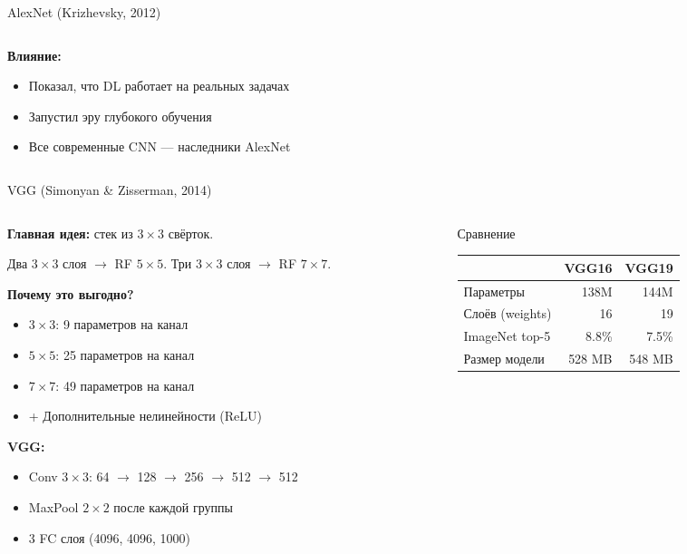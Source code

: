 \documentclass[aspectratio=169, 9pt]{beamer}
\begin{document}
\begin{frame}{AlexNet (Krizhevsky, 2012)}
\begin{columns}[T]
\begin{column}{0.5\textwidth}
      \vspace{0.3em}
      \textbf{Влияние:}
      \begin{itemize}
        \item Показал, что DL работает на реальных задачах
        \item Запустил эру глубокого обучения
        \item Все современные CNN — наследники AlexNet
      \end{itemize}
    \end{column}
  \end{columns}
\end{frame}

\begin{frame}{VGG (Simonyan \& Zisserman, 2014)}
  \begin{columns}[T]
    \begin{column}{0.5\textwidth}
      \textbf{Главная идея:} стек из $3\times3$ свёрток.
      
      \vspace{0.3em}
      Два $3\times3$ слоя $\to$ RF $5\times5$.
      Три $3\times3$ слоя $\to$ RF $7\times7$.
      
      \textbf{Почему это выгодно?}
      \begin{itemize}
        \item $3\times3$: 9 параметров на канал
        \item $5\times5$: 25 параметров на канал
        \item $7\times7$: 49 параметров на канал
        \item + Дополнительные нелинейности (ReLU)
      \end{itemize}
      
      \textbf{VGG:}
      \begin{itemize}
        \item Conv $3\times3$: 64 $\to$ 128 $\to$ 256 $\to$ 512 $\to$ 512
        \item MaxPool $2\times2$ после каждой группы
        \item 3 FC слоя (4096, 4096, 1000)
      \end{itemize}
    \end{column}
    \begin{column}{0.5\textwidth}
      \begin{block}{Сравнение}
        \centering
        \begin{tabular}{lrr}
          \toprule
          & VGG16 & VGG19 \\
          \midrule
          Параметры & 138M & 144M \\
          Слоёв (weights) & 16 & 19 \\
          ImageNet top-5 & 8.8\% & 7.5\% \\
          Размер модели & 528 MB & 548 MB \\
          \bottomrule
        \end{tabular}
      \end{block}
      

\end{column}
\end{columns}
\end{frame}
\end{document}
